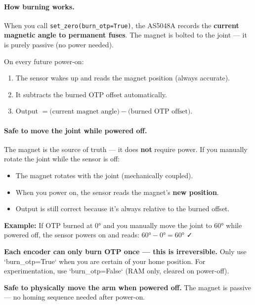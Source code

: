\documentclass[11pt,a4paper]{article}
\begin{document}
\paragraph{How burning works.}
When you call \texttt{set\_zero(burn\_otp=True)}, the AS5048A records the \textbf{current magnetic angle to permanent fuses}.
The magnet is bolted to the joint --- it is purely passive (no power needed).

On every future power-on:
\begin{enumerate}[leftmargin=2em]
  \item The sensor wakes up and reads the magnet position (always accurate).
  \item It subtracts the burned OTP offset automatically.
  \item Output $= \text{(current magnet angle)} - \text{(burned OTP offset)}$.
\end{enumerate}

\paragraph{Safe to move the joint while powered off.}
The magnet is the source of truth --- it does \textbf{not} require power.
If you manually rotate the joint while the sensor is off:
\begin{itemize}[leftmargin=2em]
  \item The magnet rotates with the joint (mechanically coupled).
  \item When you power on, the sensor reads the magnet's \textbf{new position}.
  \item Output is still correct because it's always relative to the burned offset.
\end{itemize}

\textbf{Example:} If OTP burned at 0° and you manually move the joint to 60° while powered off,
the sensor powers on and reads: $60° - 0° = 60°$ ✓

\begin{warnbox}
  \textbf{Each encoder can only burn OTP \textbf{once} --- this is irreversible.}
  Only use `burn\_otp=True` when you are certain of your home position.
  For experimentation, use `burn\_otp=False` (RAM only, cleared on power-off).
  
  \textbf{Safe to physically move the arm when powered off.}
  The magnet is passive --- no homing sequence needed after power-on.
\end{warnbox}

\end{document}
